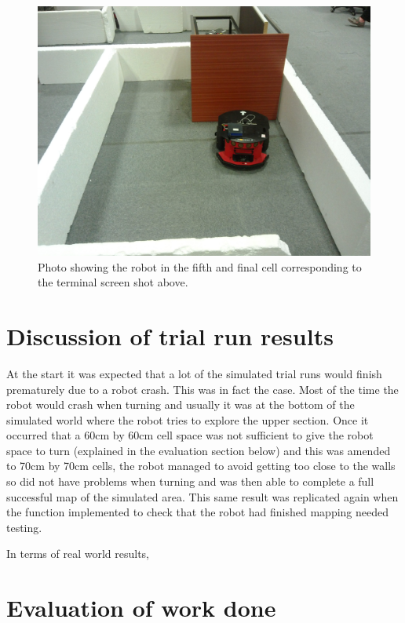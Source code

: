 \documentclass[a4paper,12pt]{article}
\begin{document}
\begin{figure}[H]
\includegraphics[scale=0.13]{RealS5.jpg}
\caption{Photo showing the robot in the fifth and final cell corresponding to the terminal screen shot above.}
\end{figure}

\section{Discussion of trial run results}
\noindent At the start it was expected that a lot of the simulated trial runs would finish prematurely due to a robot crash. This was in fact the case. Most of the time the robot would crash when turning and usually it was at the bottom of the simulated world where the robot tries to explore the upper section. Once it occurred that a 60cm by 60cm cell space was not sufficient to give the robot space to turn (explained in the evaluation section below) and this was amended to 70cm by 70cm cells, the robot managed to avoid getting too close to the walls so did not have problems when turning and was then able to complete a full successful map of the simulated area. This same result was replicated again when the function implemented to check that the robot had finished mapping needed testing.

\vspace{5mm}
\noindent In terms of real world results, 

\section{Evaluation of work done}
\end{document}
